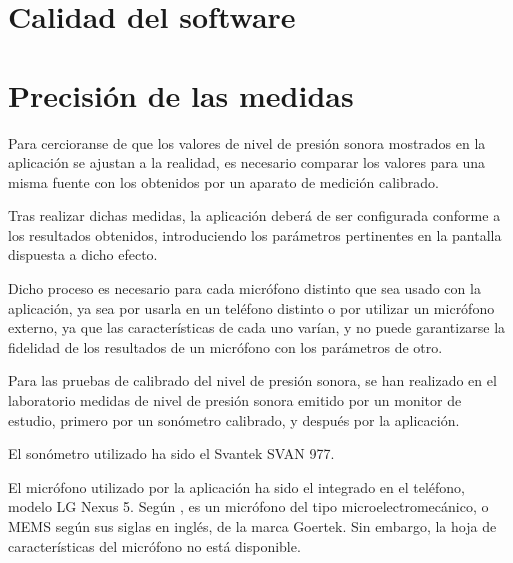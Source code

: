 \label{chp:App}

\section{Calidad del software}

\section{Precisión de las medidas}

Para cercioranse de que los valores de nivel de presión sonora mostrados en la aplicación se ajustan a la realidad, es necesario comparar los valores para una misma fuente con los obtenidos por un aparato de medición calibrado.

Tras realizar dichas medidas, la aplicación deberá de ser configurada conforme a los resultados obtenidos, introduciendo los parámetros pertinentes en la pantalla dispuesta a dicho efecto.

Dicho proceso es necesario para cada micrófono distinto que sea usado con la aplicación, ya sea por usarla en un teléfono distinto o por utilizar un micrófono externo, ya que las características de cada uno varían, y no puede garantizarse la fidelidad de los resultados de un micrófono con los parámetros de otro.

Para las pruebas de calibrado del nivel de presión sonora, se han realizado en el laboratorio medidas de nivel de presión sonora emitido por un monitor de estudio, primero por un sonómetro calibrado, y después por la aplicación.

El sonómetro utilizado ha sido el Svantek SVAN 977.

El micrófono utilizado por la aplicación ha sido el integrado en el teléfono, modelo LG Nexus 5. Según \cite{n5-svcman}, es un micrófono del tipo microelectromecánico, o MEMS según sus siglas en inglés, de la marca Goertek. Sin embargo, la hoja de características del micrófono no está disponible.

